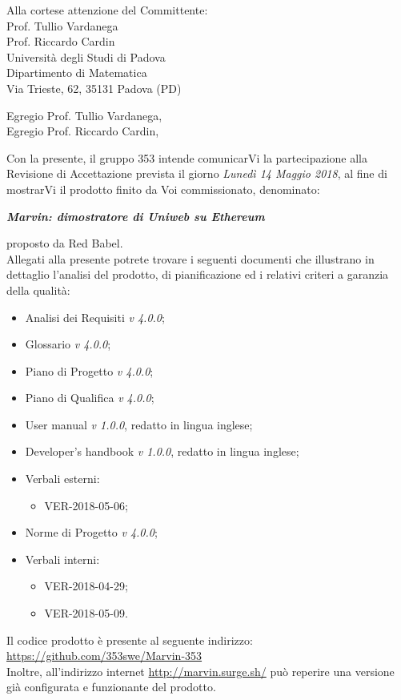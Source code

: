 \documentclass[openany, a4paper, 12pt]{letter}
\newcommand{\nURI}[1]{{\color{blue}\url{#1}}}
\newcommand{\vruno}{\textit{v 1.0.0}\xspace} %
\newcommand{\vrquattro}{\textit{v 4.0.0}\xspace} %
\begin{document}
	
	\begin{letter}{
			Alla cortese attenzione del Committente:\\
			\smallskip
			Prof. Tullio Vardanega\\
			Prof. Riccardo Cardin\\
			\medskip
			Università degli Studi di Padova \\
			Dipartimento di Matematica\\
			Via Trieste, 62, 35131 Padova (PD)}
		\opening{Egregio Prof. Tullio Vardanega, \\
			Egregio Prof. Riccardo Cardin,}
		\thispagestyle{plain}
		Con la presente, il gruppo 353 intende comunicarVi la partecipazione alla Revisione di Accettazione prevista il giorno \textit{Lunedì 14 Maggio 2018}, al fine di mostrarVi il prodotto finito da Voi commissionato, denominato: \\
		\begin{center}
			\emph{\textbf{Marvin: dimostratore di Uniweb su Ethereum}}\medskip \\
		\end{center}
		proposto da Red Babel.\medskip\\
		Allegati alla presente potrete trovare i seguenti documenti che illustrano in dettaglio l'analisi del prodotto, di pianificazione ed i relativi criteri a garanzia della qualità: 
		\begin{itemize}
			\item Analisi dei Requisiti \vrquattro;
			\item Glossario \vrquattro;
			\item Piano di Progetto \vrquattro;
			\item Piano di Qualifica \vrquattro;
			\item User manual \vruno, redatto in lingua inglese;
			\item Developer's handbook \vruno, redatto in lingua inglese;
			\item Verbali esterni:
			\begin{itemize}
				\item VER-2018-05-06;
			\end{itemize}
			\item Norme di Progetto \vrquattro;
			\item Verbali interni:
			\begin{itemize}
				\item VER-2018-04-29;
				\item VER-2018-05-09.
			\end{itemize}
		\end{itemize}
		Il codice prodotto è presente al seguente indirizzo:\\
		\nURI{https://github.com/353swe/Marvin-353}\\
		Inoltre, all'indirizzo internet \nURI{http://marvin.surge.sh/} può reperire una versione già configurata e funzionante del prodotto.
		

\end{letter}
\end{document}
